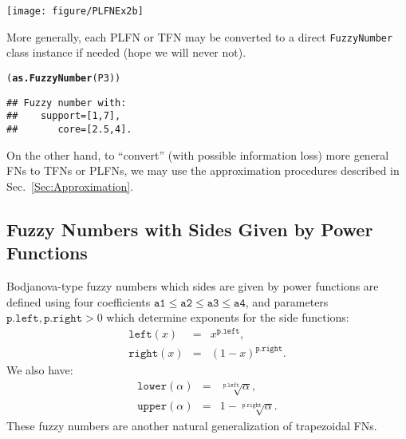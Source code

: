 \documentclass[11pt]{article}\usepackage[]{graphicx}\usepackage[]{color}
\makeatletter
\newcommand{\hlstd}[1]{\textcolor[rgb]{0.345,0.345,0.345}{#1}}%
\newcommand{\hlkwd}[1]{\textcolor[rgb]{0.737,0.353,0.396}{\textbf{#1}}}%
\newenvironment{kframe}{%
 \def\at@end@of@kframe{}%
 \ifinner\ifhmode%
  \def\at@end@of@kframe{\end{minipage}}%
  \begin{minipage}{\columnwidth}%
 \fi\fi%
 \def\FrameCommand##1{\hskip\@totalleftmargin \hskip-\fboxsep
 \colorbox{shadecolor}{##1}\hskip-\fboxsep
     \hskip-\linewidth \hskip-\@totalleftmargin \hskip\columnwidth}%
 \MakeFramed {\advance\hsize-\width
   \@totalleftmargin\z@ \linewidth\hsize
   \@setminipage}}%
 {\par\unskip\endMakeFramed%
 \at@end@of@kframe}
\newenvironment{knitrout}{}{} %
\makeatother
\begin{document}
\begin{center}
\begin{knitrout}\small
{}\color{fgcolor}

{\centering \texttt{[image: figure/PLFNEx2b]} 

}



\end{knitrout}
\end{center}

\noindent
More generally, each PLFN or TFN may be converted
to a direct \texttt{FuzzyNumber} class instance if needed
(hope we will never not).

\begin{knitrout}\small
{}\color{fgcolor}\begin{kframe}
\begin{alltt}
\hlstd{(}\hlkwd{as.FuzzyNumber}\hlstd{(P3))}
\end{alltt}
\begin{verbatim}
## Fuzzy number with:
##    support=[1,7],
##       core=[2.5,4].
\end{verbatim}
\end{kframe}
\end{knitrout}

On the other hand, to ``convert'' (with possible information loss)
more general FNs to TFNs or PLFNs, we may use the approximation
procedures described in Sec.~\ref{Sec:Approximation}.



\subsection{Fuzzy Numbers with Sides Given by Power Functions}\label{Sec:powerdef}

Bodjanova-type \cite{Bodjanova2005:medianfn}
fuzzy numbers which sides are given by power functions
are defined using four coefficients
$\mathtt{a1}\le\mathtt{a2}\le\mathtt{a3}\le\mathtt{a4}$,
and parameters $\mathtt{p.left}, \mathtt{p.right}>0$ which determine
exponents for the side functions:
\begin{eqnarray}
\mathtt{left}(x)&=&x^{\mathtt{p.left}},\\
\mathtt{right}(x)&=&(1-x)^{\mathtt{p.right}}.
\end{eqnarray}
We also have:
\begin{eqnarray}
\mathtt{lower}(\alpha)&=&\sqrt[\mathtt{p.left}]{\alpha},\\
\mathtt{upper}(\alpha)&=&1-\sqrt[\mathtt{p.right}]{\alpha}.
\end{eqnarray}
These fuzzy numbers are another natural generalization of trapezoidal FNs.
\end{document}
